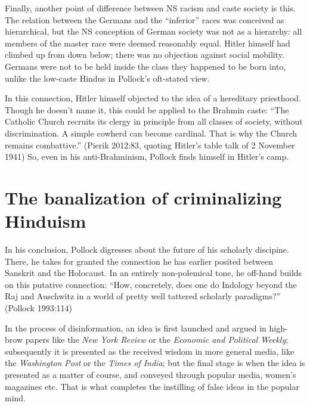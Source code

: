 Finally, another point of difference between NS racism and caste society is this. The relation between the Germans and the “inferior” races was conceived as hierarchical, but the NS conception of German society was not as a hierarchy: all members of the master race were deemed reasonably equal. Hitler himself had climbed up from down below; there was no objection against social mobility. Germans were not to be held inside the class they happened to be born into, unlike the low-caste Hindus in Pollock’s oft-stated view. 

In this connection, Hitler himself objected to the idea of a hereditary priesthood. Though he doesn’t name it, this could be applied to the Brahmin caste: “The Catholic Church recruits its clergy in principle from all classes of society, without discrimination. A simple cowherd can become cardinal. That is why the Church remains combattive.” (Pierik 2012:83, quoting Hitler’s table talk of 2 November 1941) So, even in his anti-Brahminism, Pollock finds himself in Hitler’s camp.

\section*{The banalization of criminalizing Hinduism}

In his conclusion, Pollock digresses about the future of his scholarly discipine. There, he takes for granted the connection he has earlier posited between Sanskrit and the Holocaust. In an entirely non-polemical tone, he off-hand builds on this putative connection: “How, concretely, does one do Indology beyond the Raj and Auschwitz in a world of pretty well tattered scholarly paradigms?” (Pollock 1993:114) 

In the process of disinformation, an idea is first launched and argued in high-brow papers like the {\sl New York Review} or the {\sl Economic and Political Weekly}; subsequently it is presented as the received wisdom in more general media, like the {\sl Washington Post} or the {\sl Times of India}; but the final stage is when the idea is presented as a matter of course, and conveyed through popular media, women’s magazines etc. That is what completes the instilling of false ideas in the popular mind.

